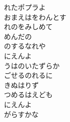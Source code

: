 \documentclass[10pt,b5j]{tarticle} %
\begin{document}
\begin{enumerate}
\begin{minipage}[c]{\blocksize}
        \vspace{\linespace}
        \item
        れたポプラよ\\
        おまえはをわんとす\\
        れのをみしめて\\
        めんだの\\
        のするなれや\\
        にえんよ\\
        うはのいたずらか\\
        ごせるのれるに\\
        きぬはりず\\
        つめるはえども\\
        にえんよ\\
        がらすかな
    
    \end{minipage}
\end{enumerate} %
\end{document}
